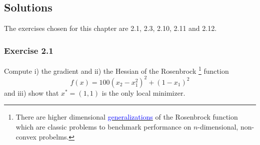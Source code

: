 \subsection{Solutions}
The exercises chosen for this chapter are 2.1, 2.3, 2.10, 2.11 and 2.12.
\subsubsection{Exercise 2.1}
Compute i) the gradient and ii) the Hessian of the Rosenbrock
\footnote{
    There are higher dimensional \href{https://en.wikipedia.org/wiki/Rosenbrock_function\#Multidimensional_generalizations}{\textcolor{blue}{generalizations}} of the Rosenbrock function which are classic problems to benchmark performance on $n$-dimensional, non-convex probelms.
} function
\[
    f(x) = 100(x_2 - x_1^2)^2 + (1-x_1)^2
\]
and iii) show that $x^* = (1,1)$ is the only local minimizer.
